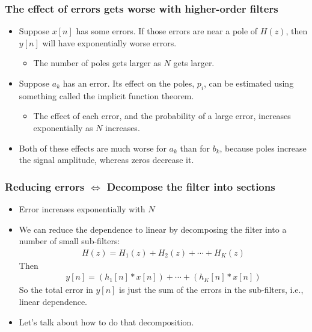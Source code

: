 \documentclass{beamer}
\begin{document}
\begin{frame}
  \frametitle{The effect of errors gets worse with higher-order filters}

  \begin{itemize}
  \item Suppose $x[n]$ has some errors.  If those errors are near a pole of
    $H(z)$, then $y[n]$ will have exponentially worse errors.
    \begin{itemize}
    \item The number of poles gets larger as $N$ gets larger.
    \end{itemize}
  \item Suppose $a_k$ has an error.  Its effect on the poles, $p_i$, can
    be estimated using something called the implicit function theorem.
    \begin{itemize}
    \item The effect of each error, and the probability of a large error,
      increases exponentially as $N$ increases.
    \end{itemize}
  \item Both of these effects are much worse for $a_k$ than for $b_k$, because
    poles increase the signal amplitude, whereas zeros decrease it.
  \end{itemize}
\end{frame}

\begin{frame}
  \frametitle{Reducing errors $\Leftrightarrow$ Decompose the filter into sections}

  \begin{itemize}
  \item Error increases exponentially with $N$
  \item We can reduce the dependence to linear by decomposing the filter
    into a number of small sub-filters:
    \begin{align*}
      H(z) = H_1(z)+H_2(z)+\cdots + H_K(z)
    \end{align*}
    Then
    \begin{align*}
      y[n] = \left(h_1[n]\ast x[n]\right)+\cdots+\left(h_K[n]\ast x[n]\right)
    \end{align*}
    So the total error in $y[n]$ is just the sum of the errors in the
    sub-filters, i.e., linear dependence.
  \item Let's talk about how to do that decomposition.
  \end{itemize}
\end{frame}
  
\end{document}
